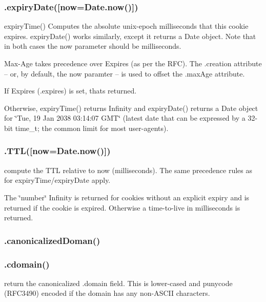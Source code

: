 \subsubsection*{{\ttfamily .expiry\+Date(\mbox{[}now=Date.\+now()\mbox{]})}}

expiry\+Time() Computes the absolute unix-\/epoch milliseconds that this cookie expires. expiry\+Date() works similarly, except it returns a {\ttfamily Date} object. Note that in both cases the {\ttfamily now} parameter should be milliseconds.

Max-\/\+Age takes precedence over Expires (as per the R\+F\+C). The {\ttfamily .creation} attribute -- or, by default, the {\ttfamily now} paramter -- is used to offset the {\ttfamily .max\+Age} attribute.

If Expires ({\ttfamily .expires}) is set, that\textquotesingle{}s returned.

Otherwise, {\ttfamily expiry\+Time()} returns {\ttfamily Infinity} and {\ttfamily expiry\+Date()} returns a {\ttfamily Date} object for \char`\"{}\+Tue, 19 Jan 2038 03\+:14\+:07 G\+M\+T\char`\"{} (latest date that can be expressed by a 32-\/bit {\ttfamily time\+\_\+t}; the common limit for most user-\/agents).

\subsubsection*{{\ttfamily .T\+T\+L(\mbox{[}now=Date.\+now()\mbox{]})}}

compute the T\+T\+L relative to {\ttfamily now} (milliseconds). The same precedence rules as for {\ttfamily expiry\+Time}/{\ttfamily expiry\+Date} apply.

The \char`\"{}number\char`\"{} {\ttfamily Infinity} is returned for cookies without an explicit expiry and {} is returned if the cookie is expired. Otherwise a time-\/to-\/live in milliseconds is returned.

\subsubsection*{{\ttfamily .canonicalized\+Doman()}}

\subsubsection*{{\ttfamily .cdomain()}}

return the canonicalized {\ttfamily .domain} field. This is lower-\/cased and punycode (R\+F\+C3490) encoded if the domain has any non-\/\+A\+S\+C\+I\+I characters.

